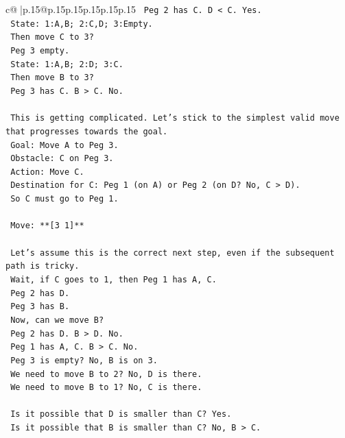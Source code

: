 \documentclass{article}
\begin{document}
{\begin{supertabular}{c@{$\;$}|p{.15\linewidth}@{}p{.15\linewidth}p{.15\linewidth}p{.15\linewidth}p{.15\linewidth}p{.15\linewidth}}
{{{\texttt{            Peg 2 has C. D < C. Yes.} \\
\texttt{            State: 1:A,B; 2:C,D; 3:Empty.} \\
\texttt{            Then move C to 3?} \\
\texttt{            Peg 3 empty.} \\
\texttt{            State: 1:A,B; 2:D; 3:C.} \\
\texttt{            Then move B to 3?} \\
\texttt{            Peg 3 has C. B > C. No.} \\
\\ 
\texttt{            This is getting complicated. Let's stick to the simplest valid move that progresses towards the goal.} \\
\texttt{            Goal: Move A to Peg 3.} \\
\texttt{            Obstacle: C on Peg 3.} \\
\texttt{            Action: Move C.} \\
\texttt{            Destination for C: Peg 1 (on A) or Peg 2 (on D? No, C > D).} \\
\texttt{            So C must go to Peg 1.} \\
\\ 
\texttt{            Move: **{[}3 1{]}**} \\
\\ 
\texttt{            Let's assume this is the correct next step, even if the subsequent path is tricky.} \\
\texttt{            Wait, if C goes to 1, then Peg 1 has A, C.} \\
\texttt{            Peg 2 has D.} \\
\texttt{            Peg 3 has B.} \\
\texttt{            Now, can we move B?} \\
\texttt{            Peg 2 has D. B > D. No.} \\
\texttt{            Peg 1 has A, C. B > C. No.} \\
\texttt{            Peg 3 is empty? No, B is on 3.} \\
\texttt{            We need to move B to 2? No, D is there.} \\
\texttt{            We need to move B to 1? No, C is there.} \\
\\ 
\texttt{            Is it possible that D is smaller than C? Yes.} \\
\texttt{            Is it possible that B is smaller than C? No, B > C.} \\
}}}
\end{supertabular}}
\end{document}
